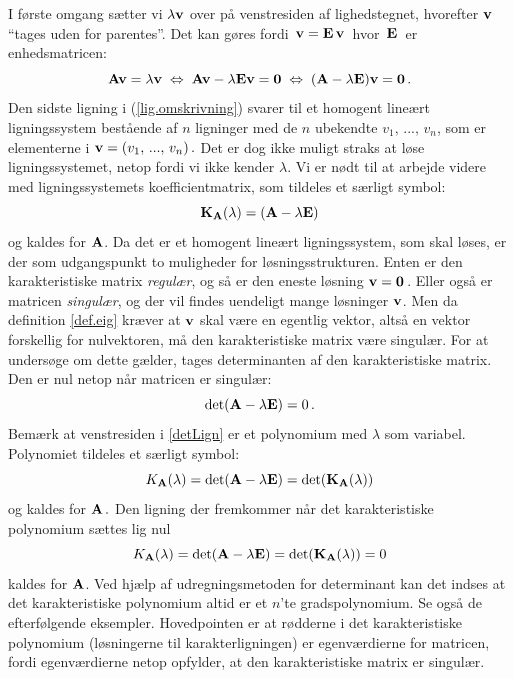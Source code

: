 I første omgang sætter vi $\lambda \mathbf{v}$ over på venstresiden af lighedstegnet, hvorefter $ \mathbf{v} $ ``tages uden for parentes''. Det kan gøres fordi $\, \mathbf{v} = \mathbf{E}\, \mathbf{v} \,$ hvor $\,\mathbf{E}\,$ er enhedsmatricen:
\begin{equation} \label{lig.omskrivning}
\mathbf{A} \mathbf{v} = \lambda \mathbf{v} \; \Leftrightarrow \; \mathbf{A} \mathbf{v} - \lambda \mathbf{E} \mathbf{v} = \bm{0} \; \Leftrightarrow \; (\mathbf{A} - \lambda \mathbf{E}) \mathbf{v} = \bm{0} \,. 
\end{equation}
Den sidste ligning i (\ref{lig.omskrivning}) svarer til et homogent lineært ligningssystem bestående af $n$ ligninger med de $n$ ubekendte $v_1,\,...,\,v_n$, som er elementerne i $\mathbf{v}=(v_1,\,...,\,v_n)\,.$ Det er dog ikke muligt straks at løse ligningssystemet, netop fordi vi ikke kender $ \lambda $. Vi er nødt til at arbejde videre med ligningssystemets koefficientmatrix, som tildeles et særligt symbol: $$ \mathbf K_{\mathbf{A}}(\lambda) = (\mathbf{A} - \lambda \mathbf{E}) $$ og kaldes  for $ \mathbf{A} $. \bs
Da det er et homogent lineært ligningssystem, som skal løses, er der som udgangspunkt to muligheder for løsningsstrukturen. Enten er den karakteristiske matrix \textit{regulær}, og så er den eneste løsning $ \mathbf{v}=\bm{0}\, $. Eller også er matricen \textit{singulær}, og der vil findes uendeligt mange løsninger $ \mathbf{v} $. Men da definition \ref{def.eig} kræver at $ \mathbf{v} $ skal være en egentlig vektor, altså en vektor forskellig for nulvektoren, må den karakteristiske matrix være singulær. For at undersøge om dette gælder, tages determinanten af den karakteristiske matrix. Den er nul netop når matricen er singulær:
\begin{equation}\label{detLign}
\det(\mathbf{A} - \lambda \mathbf{E}) = 0\,.
\end{equation}
Bemærk at venstresiden i \eqref{detLign} er et polynomium med $\lambda$ som variabel. Polynomiet tildeles et særligt symbol:
$$ K_{\mathbf{A}}(\lambda) = \det(\mathbf{A} - \lambda \mathbf{E}) = \det(\mathbf{K}_{\mathbf{A}} (\lambda) )$$ 
og kaldes  for $ \mathbf{A} \,.$ \bs
Den ligning der fremkommer når det karakteristiske polynomium sættes lig nul
$$ K_{\mathbf{A}}(\lambda) = \det(\mathbf{A} - \lambda \mathbf{E}) = \det(\mathbf{K}_{\mathbf{A}} (\lambda) )=0$$ 
kaldes  for $ \mathbf{A} $. \bs 
Ved hjælp af udregningsmetoden for determinant kan det indses at det karakteristiske polynomium altid er et $n$'te gradspolynomium. Se også de efterfølgende eksempler. Hovedpointen er at rødderne i det karakteristiske polynomium (løsningerne til karakterligningen) er egenværdierne for matricen, fordi egenværdierne netop opfylder, at den karakteristiske matrix er singulær.

